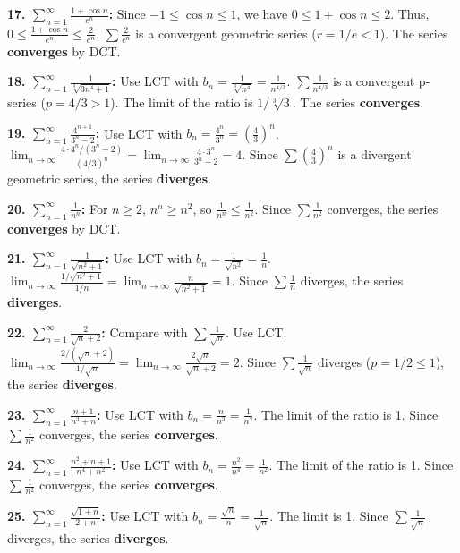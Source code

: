 \documentclass{article}
\begin{document}
\textbf{17. \(\sum_{n=1}^{\infty} \frac{1+\cos n}{e^n}\):} Since \(-1 \le \cos n \le 1\), we have \(0 \le 1+\cos n \le 2\). Thus, \(0 \le \frac{1+\cos n}{e^n} \le \frac{2}{e^n}\). \(\sum \frac{2}{e^n}\) is a convergent geometric series (\(r=1/e < 1\)). The series \textbf{converges} by DCT.

\textbf{18. \(\sum_{n=1}^{\infty} \frac{1}{\sqrt[3]{3n^4+1}}\):} Use LCT with \(b_n = \frac{1}{\sqrt[3]{n^4}} = \frac{1}{n^{4/3}}\). \(\sum \frac{1}{n^{4/3}}\) is a convergent p-series (\(p=4/3>1\)). The limit of the ratio is \(1/\sqrt[3]{3}\). The series \textbf{converges}.

\textbf{19. \(\sum_{n=1}^{\infty} \frac{4^{n+1}}{3^n-2}\):} Use LCT with \(b_n = \frac{4^n}{3^n} = (\frac{4}{3})^n\). \(\lim_{n \to \infty} \frac{4 \cdot 4^n/(3^n-2)}{(4/3)^n} = \lim_{n \to \infty} \frac{4 \cdot 3^n}{3^n-2} = 4\). Since \(\sum (\frac{4}{3})^n\) is a divergent geometric series, the series \textbf{diverges}.

\textbf{20. \(\sum_{n=1}^{\infty} \frac{1}{n^n}\):} For \(n \ge 2\), \(n^n \ge n^2\), so \(\frac{1}{n^n} \le \frac{1}{n^2}\). Since \(\sum \frac{1}{n^2}\) converges, the series \textbf{converges} by DCT.

\textbf{21. \(\sum_{n=1}^{\infty} \frac{1}{\sqrt{n^2+1}}\):} Use LCT with \(b_n = \frac{1}{\sqrt{n^2}} = \frac{1}{n}\). \(\lim_{n \to \infty} \frac{1/\sqrt{n^2+1}}{1/n} = \lim_{n \to \infty} \frac{n}{\sqrt{n^2+1}}=1\). Since \(\sum \frac{1}{n}\) diverges, the series \textbf{diverges}.

\textbf{22. \(\sum_{n=1}^{\infty} \frac{2}{\sqrt{n}+2}\):} Compare with \(\sum \frac{1}{\sqrt{n}}\). Use LCT. \(\lim_{n \to \infty} \frac{2/(\sqrt{n}+2)}{1/\sqrt{n}} = \lim_{n \to \infty} \frac{2\sqrt{n}}{\sqrt{n}+2} = 2\). Since \(\sum \frac{1}{\sqrt{n}}\) diverges (\(p=1/2 \le 1\)), the series \textbf{diverges}.

\textbf{23. \(\sum_{n=1}^{\infty} \frac{n+1}{n^3+n}\):} Use LCT with \(b_n = \frac{n}{n^3} = \frac{1}{n^2}\). The limit of the ratio is 1. Since \(\sum \frac{1}{n^2}\) converges, the series \textbf{converges}.

\textbf{24. \(\sum_{n=1}^{\infty} \frac{n^2+n+1}{n^4+n^2}\):} Use LCT with \(b_n = \frac{n^2}{n^4} = \frac{1}{n^2}\). The limit of the ratio is 1. Since \(\sum \frac{1}{n^2}\) converges, the series \textbf{converges}.

\textbf{25. \(\sum_{n=1}^{\infty} \frac{\sqrt{1+n}}{2+n}\):} Use LCT with \(b_n = \frac{\sqrt{n}}{n} = \frac{1}{\sqrt{n}}\). The limit is 1. Since \(\sum \frac{1}{\sqrt{n}}\) diverges, the series \textbf{diverges}.
\end{document}
